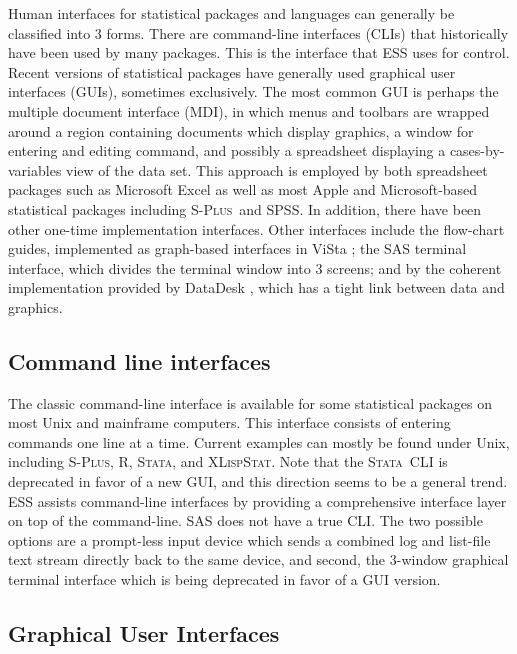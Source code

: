\documentclass{article}
\newcommand*{\Splus}{\textsc{S-Plus}}
\newcommand*{\XLispStat}{\textsc{XLispStat}}
\newcommand*{\Stata}{\textsc{Stata}}
\begin{document}
Human interfaces for statistical packages and languages can generally
be classified into 3 forms.  There are command-line interfaces (CLIs)
that historically have been used by many packages.  This is the
interface that ESS uses for control.  Recent versions of statistical
packages have generally used graphical user interfaces (GUIs),
sometimes exclusively.  The most common GUI is perhaps the multiple
document interface (MDI), in which menus and toolbars are wrapped
around a region containing documents which display graphics, a window
for entering and editing command, and possibly a spreadsheet
displaying a cases-by-variables view of the data set.  This approach
is employed by both spreadsheet packages such as Microsoft Excel as
well as most Apple and Microsoft-based statistical packages including
\Splus\ and SPSS.  In addition, there have been other one-time
implementation interfaces.  Other interfaces include the flow-chart
guides, implemented as graph-based interfaces in ViSta
\citep{youn:lubi:1995}; the SAS terminal interface, which divides the
terminal window into 3 screens; and by the coherent implementation
provided by DataDesk \citep{vell:prat:1989}, which has a tight link
between data and graphics.

\subsection{Command line interfaces}
\label{sec:UI:command}

The classic command-line interface is available for some statistical
packages on most Unix and mainframe computers.  This interface
consists of entering commands one line at a time.  Current examples can
mostly be found under Unix, including \Splus, R, \Stata, and \XLispStat.
Note that the \Stata\ CLI is deprecated in favor of a new GUI, and
this direction seems to be a general trend.  ESS assists command-line
interfaces by providing a comprehensive interface layer on top of the
command-line.  SAS does not have a true CLI.  The two possible options
are a prompt-less input device which sends a combined log and
list-file text stream directly back to the same device, and second,
the 3-window graphical terminal interface which is being deprecated
in favor of a GUI version.

\subsection{Graphical User Interfaces}
\label{sec:UI:GUI}
\end{document}
